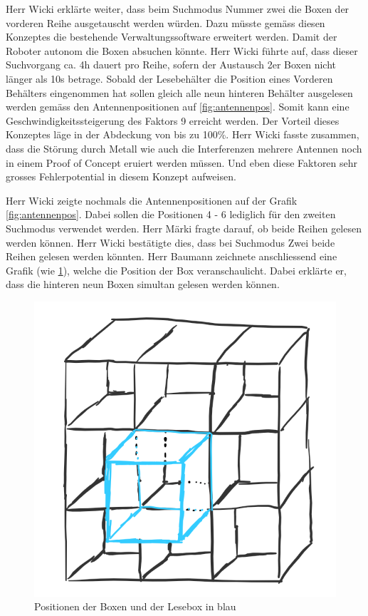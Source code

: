 \documentclass[parskip=full, a4paper]{scrreprt}
\begin{document}
Herr Wicki erklärte weiter, dass beim Suchmodus Nummer zwei die Boxen der vorderen Reihe ausgetauscht werden würden. Dazu müsste gemäss diesen Konzeptes die bestehende Verwaltungssoftware erweitert werden. Damit der Roboter autonom die Boxen absuchen könnte. Herr Wicki führte auf, dass dieser Suchvorgang ca. 4h dauert pro Reihe, sofern der Austausch 2er Boxen nicht länger als 10s betrage. Sobald der Lesebehälter die Position eines Vorderen Behälters eingenommen hat sollen gleich alle neun hinteren Behälter ausgelesen werden gemäss den Antennenpositionen auf \ref{fig:antennenpos}. Somit kann eine Geschwindigkeitssteigerung des Faktors 9 erreicht werden. Der Vorteil dieses Konzeptes läge in der Abdeckung von bis zu 100\%. Herr Wicki fasste zusammen, dass die Störung durch Metall wie auch die Interferenzen mehrere Antennen noch in einem Proof of Concept eruiert werden müssen. Und eben diese Faktoren sehr grosses Fehlerpotential in diesem Konzept aufweisen.

Herr Wicki zeigte nochmals die Antennenpositionen auf der Grafik \ref{fig:antennenpos}. Dabei sollen die Positionen 4 - 6 lediglich für den zweiten Suchmodus verwendet werden.
Herr Märki fragte darauf, ob beide Reihen gelesen werden können. Herr Wicki bestätigte dies, dass bei Suchmodus Zwei beide Reihen gelesen werden könnten.
Herr Baumann zeichnete anschliessend eine Grafik (wie  \ref{fig:boxenposition}), welche die Position der Box veranschaulicht. Dabei erklärte er, dass die hinteren neun Boxen simultan gelesen werden können.

\begin{figure}
	\centering
	\includegraphics[keepaspectratio, width=0.6\linewidth]{images/Konzept_1_Drawings4.png}
	\caption{Positionen der Boxen und der Lesebox in blau}
	\label{fig:boxenposition}
\end{figure}
\end{document}
